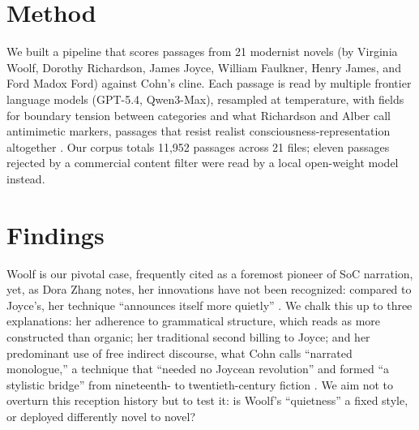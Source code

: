 \documentclass{anthology-ch}         %
\begin{document}
\section{Method}

We built a pipeline that scores passages from 21
modernist novels (by Virginia Woolf, Dorothy Richardson, James Joyce, William
Faulkner, Henry James, and Ford Madox Ford) against Cohn's cline. Each
passage is read by multiple frontier language models (GPT-5.4,
Qwen3-Max), resampled at temperature, with fields for boundary
tension between categories and what Richardson and Alber call antimimetic
markers, passages that resist realist consciousness-representation
altogether \cite{alberrichardson2015unnatural}. Our corpus totals 11,952
passages across 21 files; eleven passages rejected by a commercial content
filter were read by a local open-weight model instead.

\section{Findings}

Woolf is our pivotal case, frequently cited as a foremost pioneer of
SoC narration, yet, as Dora Zhang notes, her innovations have not been
recognized: compared to Joyce's, her technique ``announces itself more
quietly'' \cite{zhang2021streamofconsciousness}.
We chalk this up to three explanations: her adherence to grammatical structure,
which reads as more constructed than organic; her traditional second billing
to Joyce; and her predominant use of free indirect discourse, what Cohn
calls ``narrated monologue,'' a technique that ``needed no Joycean
revolution'' and formed ``a stylistic bridge'' from nineteenth- to
twentieth-century fiction \cite{cohn1978transparent}. We aim not to overturn
this reception history but to test it: is Woolf's ``quietness'' a fixed style,
or deployed differently novel to novel?
\end{document}
